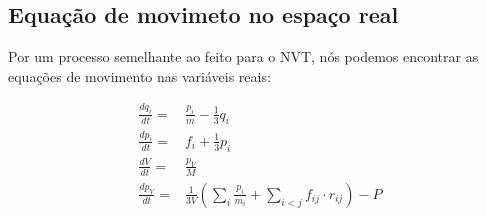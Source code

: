\documentclass[twoside, a4paper]{scrartcl}
\newcommand{\deri}[2]{\frac{d #1}{d #2}}
\begin{document}
\subsection{Equação de movimeto no espaço real}

Por um processo semelhante ao feito para o NVT, nós podemos encontrar as equações de movimento nas variáveis reais:

\begin{align}
	\deri{q_i}{t} =& \frac{p_i}{m} - \frac{1}{3}{q_i} \\
	\deri{p_i}{t} =& f_i +\frac{1}{3}{p_i} \\
	\deri{V}{t} =& \frac{p_V}{M}\\
	\deri{p_V}{t} =& \frac{1}{3V}\left(\sum_i \frac{p_i}{m_i} + \sum_{i<j} f_{ij}\cdot r_{ij}\right) - P
\end{align}
\end{document}
